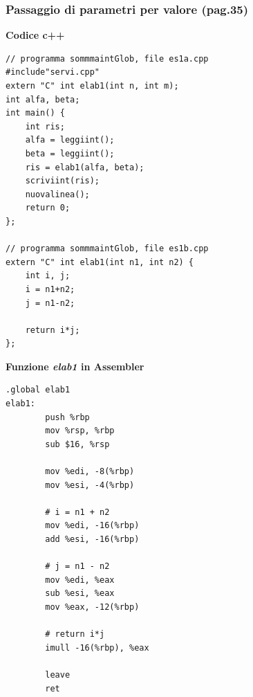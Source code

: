 \documentclass[11pt]{report}
\theoremstyle{definition}
\begin{document}
\subsubsection{Passaggio di parametri per valore (pag.35)}
\begin{framed}
\noindent \textbf{Codice c++}
\begin{multicols}{2}
\begin{verbatim}
// programma sommmaintGlob, file es1a.cpp
#include"servi.cpp"
extern "C" int elab1(int n, int m);
int alfa, beta;
int main() { 
    int ris;
    alfa = leggiint(); 
    beta = leggiint();
    ris = elab1(alfa, beta);
    scriviint(ris); 
    nuovalinea();
    return 0;
};

// programma sommmaintGlob, file es1b.cpp
extern "C" int elab1(int n1, int n2) { 
    int i, j;
    i = n1+n2;
    j = n1-n2;
    
    return i*j;
};
\end{verbatim}
\end{multicols}\end{framed}
\noindent \textbf{Funzione \emph{elab1} in Assembler}
\begin{multicols}{2}
\begin{verbatim}
.global elab1
elab1:
        push %rbp
        mov %rsp, %rbp
        sub $16, %rsp
    
        mov %edi, -8(%rbp)
        mov %esi, -4(%rbp)
    
        # i = n1 + n2
        mov %edi, -16(%rbp)
        add %esi, -16(%rbp)
    
        # j = n1 - n2
        mov %edi, %eax
        sub %esi, %eax
        mov %eax, -12(%rbp)
      
        # return i*j
        imull -16(%rbp), %eax
      
        leave   
        ret
\end{verbatim}
\end{multicols}
\end{document}
